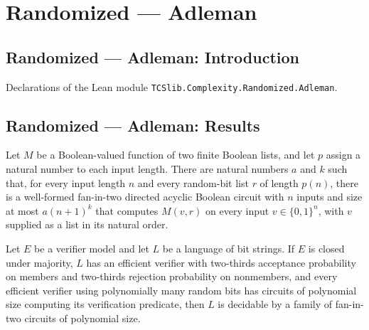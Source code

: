 \section{Randomized --- Adleman}
\subsection*{Randomized --- Adleman: Introduction}

Declarations of the Lean module \texttt{TCSlib.Complexity.Randomized.Adleman}.

\subsection*{Randomized --- Adleman: Results}

\begin{definition}
\label{Randomized.VerifierHasCircuits}
\leanok
{}
Let $M$ be a Boolean-valued function of two finite Boolean lists, and let $p$ assign a
natural number to each input length. There are natural numbers $a$ and $k$ such that,
for every input length $n$ and every random-bit list $r$ of length $p(n)$, there is a
well-formed fan-in-two directed acyclic Boolean circuit with $n$ inputs and size at most
$a(n+1)^k$ that computes $M(v,r)$ on every input $v\in\{0,1\}^n$, with $v$ supplied as a
list in its natural order.
\end{definition}

\begin{theorem}
\label{Randomized.adleman}
\leanok
{}
Let $E$ be a verifier model and let $L$ be a language of bit strings. If $E$ is closed
under majority, $L$ has an efficient verifier with two-thirds acceptance probability on
members and two-thirds rejection probability on nonmembers, and every efficient verifier
using polynomially many random bits has circuits of polynomial size computing its
verification predicate, then $L$ is decidable by a family of fan-in-two circuits of
polynomial size.
\end{theorem}
